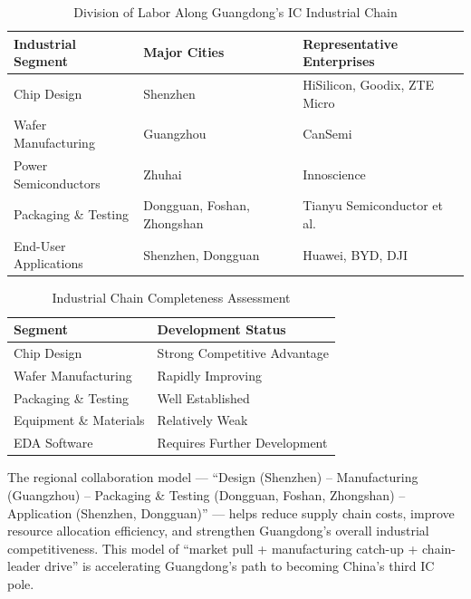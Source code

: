 \documentclass[12pt,a4paper]{article}
\newcommand{\tableHeaderRow}{\rowcolor{tealPrimary}\color{white}}
\newcommand{\tableOddRow}{\rowcolor{mintBG}}
\newcommand{\tableEvenRow}{\rowcolor{white}}
\begin{document}
\begin{table}[H]
\centering
\caption{Division of Labor Along Guangdong's IC Industrial Chain}
\label{tab:chain_division}
\begin{tabular}{p{3cm}p{4cm}p{6cm}}
\toprule
\tableHeaderRow
\textbf{Industrial Segment} & \textbf{Major Cities} & \textbf{Representative Enterprises} \\
\midrule
\tableOddRow Chip Design & Shenzhen & HiSilicon, Goodix, ZTE Micro \\
\tableEvenRow Wafer Manufacturing & Guangzhou & CanSemi \\
\tableOddRow Power Semiconductors & Zhuhai & Innoscience \\
\tableEvenRow Packaging \& Testing & Dongguan, Foshan, Zhongshan & Tianyu Semiconductor et al. \\
\tableOddRow End-User Applications & Shenzhen, Dongguan & Huawei, BYD, DJI \\
\bottomrule
\end{tabular}
\end{table}

\begin{table}[H]
\centering
\caption{Industrial Chain Completeness Assessment}
\label{tab:chain_completeness}
\begin{tabular}{p{4.5cm}p{8.5cm}}
\toprule
\tableHeaderRow
\textbf{Segment} & \textbf{Development Status} \\
\midrule
\tableOddRow Chip Design & Strong Competitive Advantage \\
\tableEvenRow Wafer Manufacturing & Rapidly Improving \\
\tableOddRow Packaging \& Testing & Well Established \\
\tableEvenRow Equipment \& Materials & Relatively Weak \\
\tableOddRow EDA Software & Requires Further Development \\
\bottomrule
\end{tabular}
\end{table}

The regional collaboration model — ``Design (Shenzhen) -- Manufacturing
(Guangzhou) -- Packaging \& Testing (Dongguan, Foshan, Zhongshan) --
Application (Shenzhen, Dongguan)'' — helps reduce supply chain costs,
improve resource allocation efficiency, and strengthen Guangdong's
overall industrial competitiveness. This model of ``market pull +
manufacturing catch-up + chain-leader drive'' is accelerating
Guangdong's path to becoming China's third IC pole.
\end{document}
